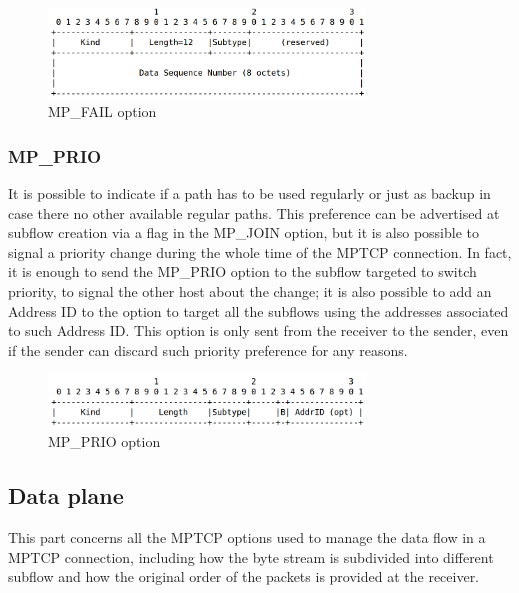 \begin{figure}[!htb]
\centering
\includegraphics[width=0.75\textwidth]{images/opt_fail}
\caption{MP\_FAIL option}
\label{fig:opt_fail}
\end{figure}

\subsubsection{MP\_PRIO}
It is possible to indicate if a path has to be used regularly or just as backup in case there no other available regular paths. This preference can be advertised at subflow creation via a flag in the MP\_JOIN option, but it is also possible to signal a priority change during the whole time of the MPTCP connection. In fact, it is enough to send the MP\_PRIO option to the subflow targeted to switch priority, to signal the other host about the change; it is also possible to add an Address ID to the option to target all the subflows using the addresses associated to such Address ID. This option is only sent from the receiver to the sender, even if the sender can discard such priority preference for any reasons. 


\begin{figure}[!htb]
\centering
\includegraphics[width=0.75\textwidth]{images/opt_prio}
\caption{MP\_PRIO option}
\label{fig:opt_prio}
\end{figure}

\subsection{Data plane}
This part concerns all the MPTCP options used to manage the data flow in a MPTCP connection, including how the byte stream is subdivided into different subflow and how the original order of the packets is provided at the receiver.

